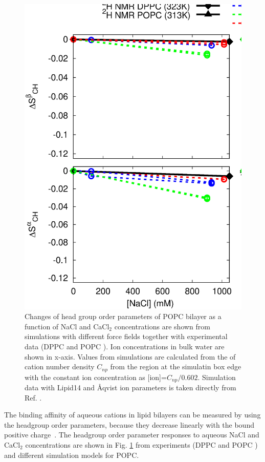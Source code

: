 \documentclass[aip,jcp,twocolumn]{revtex4}
\begin{document}
\begin{figure}[tbp]
  \centering
  \includegraphics[width=16.0cm]{../Fig/OrdParChanges_NaCl_CaCl2.eps}
  \caption{\label{OrderParameterCHANGESnewMODELS}
    Changes of head group order parameters of POPC bilayer as a function of NaCl and CaCl$_2$ concentrations
    are shown from simulations with different force fields together with experimental data 
    (DPPC \cite{akutsu81} and POPC \cite{altenbach84}). 
    Ion concentrations in bulk water are shown in x-axis. 
    Values from simulations are calculated from the of cation number density $C_{np}$
    from the region at the simulatin box edge with the constant ion concentration as [ion]=$C_{np}/0.602$.
    Simulation data with Lipid14 and \AA{}qvist ion parameters is taken directly from Ref. \cite{catte16}.
  }
\end{figure}

The binding affinity of aqueous cations in lipid 
bilayers can be measured by using the headgroup 
order parameters, because they decrease linearly 
with the bound positive charge~\cite{seelig87,catte16}. 
The headgroup order parameter responses 
to aqueous NaCl and CaCl$_2$ concentrations 
are shown in Fig. \ref{OrderParameterCHANGESnewMODELS}
from experiments (DPPC \cite{akutsu81} 
and POPC \cite{altenbach84}) and different simulation models for POPC. 
\end{document}
